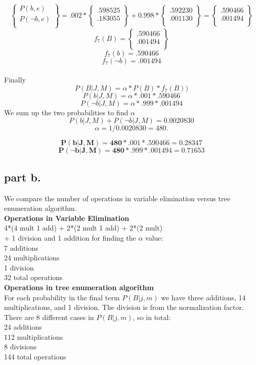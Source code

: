 \[
\begin{Bmatrix} P(b,e) \\ P(\neg b, e) \\ \end{Bmatrix} =
.002 * \begin{Bmatrix} .598525 \\ .183055 \\\end{Bmatrix} + 0.998 * \begin{Bmatrix}.592230 \\ .001130 \\ \end{Bmatrix} =
\begin{Bmatrix} .590466 \\ .001494 \\ \end{Bmatrix}
\]
\[
f_7(B) = \begin{Bmatrix} .590466 \\ .001494 \\ \end{Bmatrix}
\]
\[
f_7(b) = .590466
\]
\[
f_7(\neg b) = .001494
\]
\\
Finally
\[
P(B|J,M) = \alpha * P(B) * f_7(B) )
\]
\[
P(b|J,M) = \alpha * .001 * .590466
\]
\[
P(\neg b|J,M) = \alpha * .999 * .001494
\]
We sum up the two probabilities to find $\alpha$
\[
{P(b|J,M) + P(\neg b | J,M) = 0.0020830}
\]
\[
\alpha = 1 / 0.0020830 = 480.
\]

\[
\bm{
P(b|J,M) = 480 * .001 * .590466 = 0.28347
}
\]
\[
\bm{
P(\neg b|J,M) = 480 * .999 * .001494 = 0.71653
}
\]


\subsection{part b.}
We compare the number of operations in variable elimination versus tree enumeration algorithm. \\

\textbf{Operations in Variable Elimination} \\
4*(4 mult 1 add) +  2*(2 mult 1 add) + 2*(2 mult) \\
+ 1 division and 1 addition for finding the $\alpha$ value: \\
7 additions \\
24 multiplications \\
1 division \\
32 total operations \\

\textbf{Operations in tree enumeration algorithm} \\
For each probability in the final term $P(B|j,m)$ we have three additions, 14 multiplications, and 1 division. The division is from the normalization factor.
There are 8 different cases in $P(B|j,m)$, so in total: \\
24 additions \\
112 multiplications \\
8 divisions \\
144 total operations \\

